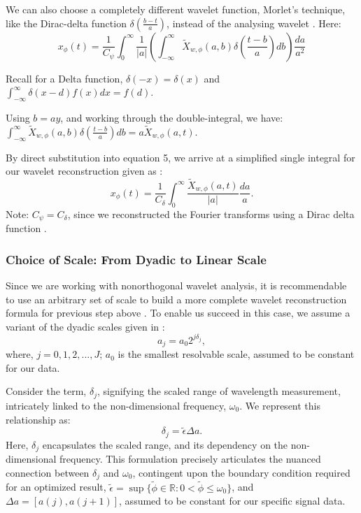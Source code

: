 \documentclass{article}
\begin{document}
We can also choose a completely different wavelet function, Morlet's technique, like the Dirac-delta function $\delta\left(\frac{b-t}{a}\right)$, instead of the analysing wavelet \cite{doi:10.1146/annurev.fl.24.010192.002143,Roy_2022}. Here: 
\begin{equation}
    x_{\phi}(t) = \frac{1}{C_{\psi}} \int_{0}^{\infty}\frac{1}{|a|} \left(\int_{-\infty}^{\infty} \tilde{X}_{w,\phi}(a,b)\delta\left(\frac{t-b}{a}\right)db\right)\frac{da}{a^2}
\end{equation}


Recall for a Delta function, $\delta(-x)=\delta(x)$ and $\int_{-\infty}^{\infty}\delta(x-d)f(x) dx=f(d)$.

Using $b=ay$, and working through the double-integral, we have: $\int_{-\infty}^{\infty} \tilde{X}_{w,\phi}(a,b)\delta\left(\frac{t-b}{a}\right)db = a\tilde{X}_{w,\phi}(a,t)$.

By direct substitution into equation 5, we arrive at a simplified single integral for our wavelet reconstruction given as \cite{doi:10.1146/annurev.fl.24.010192.002143,Roy_2022,APracticalGuidetoWaveletAnalysis}:
\begin{equation}
     x_{\phi}(t) = \frac{1}{C_{\delta}} \int_{0}^{\infty}\frac{\tilde{X}_{w,\phi}(a,t)}{|a|}\frac{da}{a}.
\end{equation}
Note: $C_{\psi}=C_{\delta}$, since we reconstructed the Fourier transforms using a Dirac delta function \cite{APracticalGuidetoWaveletAnalysis}.

\subsubsection{Choice of Scale: From Dyadic to Linear Scale}
Since we are working with nonorthogonal wavelet analysis, it is recommendable to use an arbitrary set of scale to build a more complete wavelet reconstruction formula for previous step above \cite{APracticalGuidetoWaveletAnalysis}. To enable us succeed in this case, we assume a variant of the dyadic scales given in \cite{pereyra2012harmonic,APracticalGuidetoWaveletAnalysis}: 
\begin{equation}
    a_{j} =a_{0}2^{j\delta_{j}},
\end{equation}
where, $j=0,1,2,...,J$; $a_{0}$ is the smallest resolvable scale, assumed to be constant for our data. 

Consider the term, $\delta_{j}$, signifying the scaled range of wavelength measurement, intricately linked to the non-dimensional frequency, $\omega_{0}$. We represent this relationship as: 
\begin{equation}
    \delta_{j} = \tilde{\epsilon}\Delta{a}.
\end{equation}
Here, $\delta_{j}$ encapsulates the scaled range, and its dependency on the non-dimensional frequency. This formulation precisely articulates the nuanced connection between $\delta_{j}$ and $\omega_{0}$, contingent upon the boundary condition required for an optimized result, $\tilde{\epsilon} = \sup\{\tilde{\phi} \in \mathbb{R}: 0 < \tilde{\phi} \leq \omega_0\}$, and $\Delta{a}=[a(j),a(j+1)]$, assumed to be constant for our specific signal data. 
\end{document}
